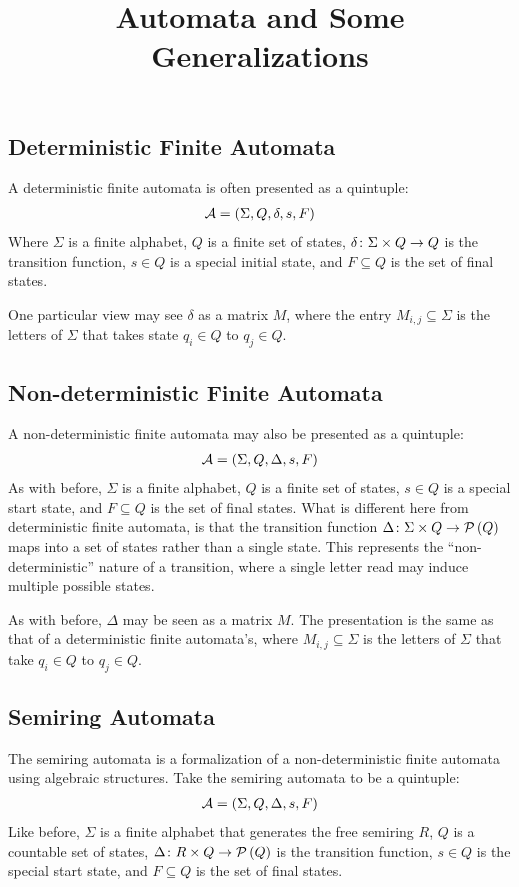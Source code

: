 \documentclass[12pt]{article}
\title{Automata and Some Generalizations}
\date{}
\begin{document}
\maketitle


\subsection{Deterministic Finite Automata}
A deterministic finite automata is often presented as a quintuple:
\begin{align*}
  \mathcal{A}
    = \left(\Sigma, Q, \delta, s, F\right)
\end{align*}
Where \(\Sigma\) is a finite alphabet,
\(Q\) is a finite set of states,
\(\delta \colon \Sigma \times Q \to Q\)
is the transition function,
\(s \in Q\) is a special initial state,
and \(F \subseteq Q\) is the set of final states.

One particular view may see \(\delta\) as a matrix \(M\),
where the entry \(M_{i, j} \subseteq \Sigma\)
is the letters of \(\Sigma\)
that takes state \(q_i \in Q\) to \(q_j \in Q\).


\subsection{Non-deterministic Finite Automata}
A non-deterministic finite automata may also be presented as a quintuple:
\begin{align*}
  \mathcal{A} = \left(\Sigma, Q, \Delta, s, F\right)
\end{align*}
As with before, \(\Sigma\) is a finite alphabet,
\(Q\) is a finite set of states, \(s \in Q\) is a special start
state, and \(F \subseteq Q\) is the set of final states.
What is different here from deterministic finite automata,
is that the transition function
\(\Delta \colon \Sigma \times Q \to \mathcal{P}\left(Q\right)\) maps into a set of states
rather than a single state.
This represents the ``non-deterministic'' nature of a transition,
where a single letter read may induce multiple possible states.

As with before, \(\Delta\) may be seen as a matrix \(M\).
The presentation is the same as that of a deterministic finite
automata's, where \(M_{i, j} \subseteq \Sigma\) is the letters of \(\Sigma\)
that take \(q_i \in Q\) to \(q_j \in Q\).


\subsection{Semiring Automata}
The semiring automata is a formalization of a
non-deterministic finite automata using algebraic structures.
Take the semiring automata to be a quintuple:
\begin{align*}
  \mathcal{A} = \left(\Sigma, Q, \Delta, s, F\right)
\end{align*}
Like before, \(\Sigma\) is a finite alphabet that generates
the free semiring \(R\),
\(Q\) is a countable set of states,
\(\Delta \colon R \times Q \to \mathcal{P}\left(Q\right)\) is the transition function,
\(s \in Q\) is the special start state,
and \(F \subseteq Q\) is the set of final states.
\end{document}
